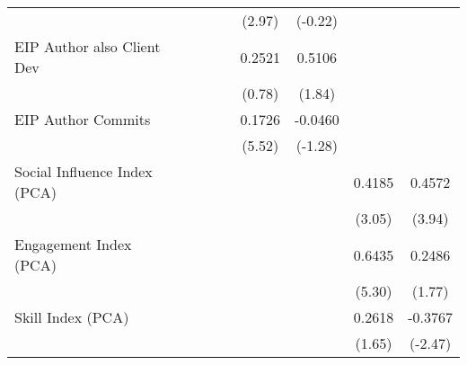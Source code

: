 {\begin{tabular}{l*{8}{c}}
                                   &                   &                   &                   &                   &    (2.97)         &   (-0.22)         &                   &                   \\
[1em]
EIP Author also Client Dev         &                   &                   &                   &                   &    0.2521         &    0.5106\sym{*}  &                   &                   \\
                                   &                   &                   &                   &                   &    (0.78)         &    (1.84)         &                   &                   \\
[1em]
EIP Author Commits                 &                   &                   &                   &                   &    0.1726\sym{***}&   -0.0460         &                   &                   \\
                                   &                   &                   &                   &                   &    (5.52)         &   (-1.28)         &                   &                   \\
[1em]
Social Influence Index (PCA)       &                   &                   &                   &                   &                   &                   &    0.4185\sym{***}&    0.4572\sym{***}\\
                                   &                   &                   &                   &                   &                   &                   &    (3.05)         &    (3.94)         \\
[1em]
Engagement Index (PCA)             &                   &                   &                   &                   &                   &                   &    0.6435\sym{***}&    0.2486\sym{*}  \\
                                   &                   &                   &                   &                   &                   &                   &    (5.30)         &    (1.77)         \\
[1em]
Skill Index (PCA)                  &                   &                   &                   &                   &                   &                   &    0.2618\sym{*}  &   -0.3767\sym{**} \\
                                   &                   &                   &                   &                   &                   &                   &    (1.65)         &   (-2.47)         \\

\end{tabular}}
